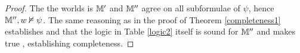 \begin{proof}
  The the worlds is $\mathbbm{M}'$ and $\mathbbm{M}''$ agree on all
  subformulae of $\psi$, hence $\mathbbm{M}'', w \nvDash \psi$. The same
  reasoning as in the proof of Theorem \ref{completeness1} establishes and
  that the logic in Table \ref{logic2} itself is sound for $\mathbbm{M}''$ and
  makes true , establishing completeness.
\end{proof}

